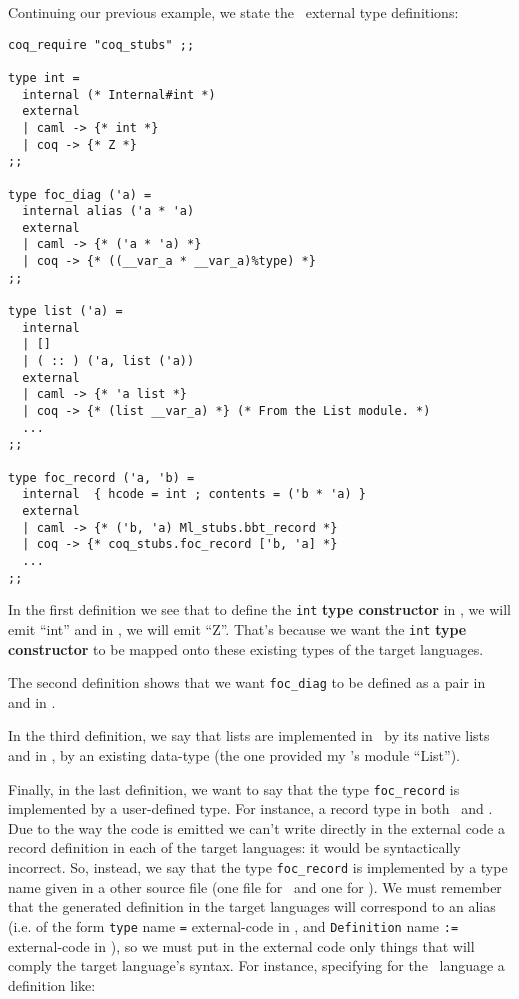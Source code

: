 Continuing our previous example, we state the \focalize\ external type
definitions:

{\footnotesize
\begin{lstlisting}[title=External type definitions (2)]
coq_require "coq_stubs" ;;

type int =
  internal (* Internal#int *)
  external
  | caml -> {* int *}
  | coq -> {* Z *}
;;

type foc_diag ('a) =
  internal alias ('a * 'a)
  external
  | caml -> {* ('a * 'a) *}
  | coq -> {* ((__var_a * __var_a)%type) *}
;;

type list ('a) =
  internal
  | []
  | ( :: ) ('a, list ('a))
  external
  | caml -> {* 'a list *}
  | coq -> {* (list __var_a) *} (* From the List module. *)
  ...
;;

type foc_record ('a, 'b) =
  internal  { hcode = int ; contents = ('b * 'a) }
  external
  | caml -> {* ('b, 'a) Ml_stubs.bbt_record *}
  | coq -> {* coq_stubs.foc_record ['b, 'a] *}
  ...
;;
\end{lstlisting}
}

In the first definition we see that to define the {\tt int}
{\bf type constructor} in \ocaml, we will emit ``int'' and in \coq, we
will emit ``Z''. That's because we want the {\tt int}
{\bf type constructor} to be mapped onto these existing types of the
target languages.

The second definition shows that we want {\tt foc\_diag} to be defined
as a pair in \ocaml and in \coq.

In the third definition, we say that lists are implemented in \ocaml\
by its native lists and in \coq, by an existing data-type (the one
provided my \coq's module ``List'').

Finally, in the last definition, we want to say that the type
{\tt foc\_record} is implemented by a user-defined type. For instance,
a record type in both \ocaml\ and \coq. Due to the way the code is
emitted we can't write directly in the external code a record
definition in each of the target languages: it would be syntactically
incorrect. So, instead, we say that the type {\tt foc\_record} is
implemented by a type name given in a other source file (one file for
\ocaml\ and one for \coq). We must remember that the generated
definition in the target languages will correspond to an alias
(i.e. of the form {\tt type} name {\tt =} external-code in \ocaml, and
{\tt Definition} name {\tt :=} external-code in \coq), so we must put
in the external code only things that will comply the target
language's syntax. For instance, specifying for the \coq\ language a
definition like:

